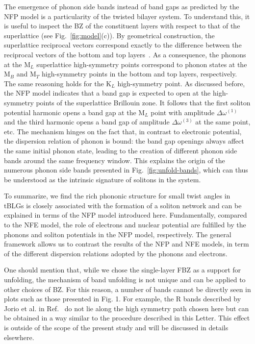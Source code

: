 \documentclass[prl,preprint]{revtex4}
\newcommand{\KK}{\mathrm{K}}
\newcommand{\KM}{\mathrm{M}}
\begin{document}
The emergence of phonon side bands instead of band gaps as predicted by the \gls{NFP} model is a particularity of the twisted bilayer system. To understand this, it is useful to inspect the BZ of the constituent layers with respect to that of the superlattice (see Fig.~\ref{fig:model}(c)). By geometrical construction, the superlattice reciprocal vectors correspond exactly to the difference between the reciprocal vectors of the bottom and top layers~\cite{Nam2017,Koshino2019a}. As a consequence, the phonons at the $\KM_L$ superlattice high-symmetry points correspond to phonon states at the $\KM_B$ and $\KM_T$ high-symmetry points in the bottom and top layers, respectively. The same reasoning holds for the $\KK_L$ high-symmetry point. As discussed before, the \gls{NFP} model indicates that a band gap is expected to open at the high-symmetry points of the superlattice Brillouin zone. It follows that the first soliton potential harmonic opens a band gap at the $\KM_L$ point with amplitude $\Delta\omega^{(1)}$ and the third harmonic opens a band gap of amplitude $\Delta \omega^{(3)}$ at the same point, etc. The mechanism hinges on the fact that, in contrast to electronic potential, the dispersion relation of phonon is bound: the band gap openings always affect the same initial phonon state, leading to the creation of different phonon side bands around the same frequency window. This explains the origin of the numerous phonon side bands presented in Fig.~\ref{fig:unfold-bands}, which can thus be understood as the intrinsic signature of solitons in the system. 

To summarize, we find the rich phononic structure for small twist angles in tBLGs is closely associated with the formation of a soliton network and can be explained in terms of the NFP model introduced here. Fundamentally, compared to the NFE model, the role of electrons and nuclear potential are fulfilled by the phonons and soliton potentials in the NFP model, respectively. The general framework allows us to contrast the results of the NFP and NFE models, in term of the different dispersion relations adopted by the phonons and electrons. 

One should mention that, while we chose the single-layer \gls{FBZ} as a support for unfolding, the mechanism of band unfolding is not unique and can be applied to other choices of BZ. For this reason, a number of bands cannot be directly seen in plots such as those presented in Fig. 1. For example, the R bands described by Jorio et al. in Ref.~\cite{jorio2013RamanSpectroscopyTwisted} do not lie along the high symmetry path chosen here but can be obtained in a way similar to the procedure described in this Letter. This effect is outside of the scope of the present study and will be discussed in details elsewhere.
\end{document}
